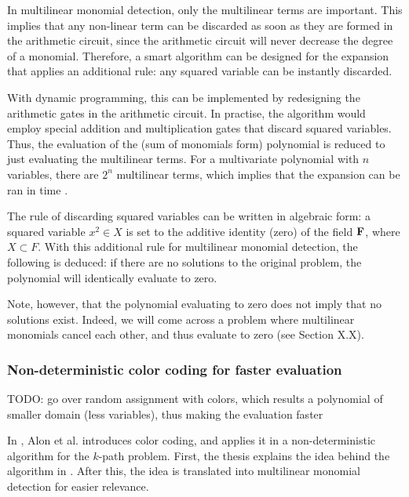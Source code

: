 In multilinear monomial detection, only the multilinear terms are important. This implies that any non-linear term can be discarded 
as soon as they are formed in the arithmetic circuit, since the arithmetic circuit will never decrease the degree of a monomial. 
Therefore, a smart algorithm can be designed for the expansion that applies an additional rule: 
any squared variable can be instantly discarded.\nl

With dynamic programming, this can be implemented by redesigning the arithmetic gates in the arithmetic circuit. 
In practise, the algorithm would employ special addition and multiplication gates that discard squared variables. 
Thus, the evaluation of the (sum of monomials form) polynomial is reduced to just evaluating the multilinear terms. 
For a multivariate polynomial with $n$ variables, there are $2^n$ multilinear terms, which implies 
that the expansion can be ran in  time \cite{KouWil15}.\nl

The rule of discarding squared variables can be written in algebraic form: 
a squared variable $x^2 \in X$ is set to the additive identity (zero) of the field $\textbf F$, 
where $X \subset F$. 
With this additional rule for multilinear monomial detection, the following is deduced: 
if there are no solutions to the original problem, 
the polynomial will identically evaluate to zero.\nl

Note, however, that the polynomial evaluating to zero does not imply that no solutions exist. 
Indeed, we will come across a problem where multilinear monomials cancel each other, 
and thus evaluate to zero (see Section X.X).

\subsubsection{Non-deterministic color coding for faster evaluation}

TODO: go over random assignment with colors, 
which results a polynomial of smaller domain (less variables), thus 
making the evaluation faster

In \cite{Alon95}, Alon et al. introduces color coding, and applies it in a non-deterministic algorithm 
for the $k$-path problem. First, the thesis explains the idea behind the algorithm in \cite{Alon95}. 
After this, the idea is translated into multilinear monomial detection for easier relevance.

\begin{problem}
\end{problem}

